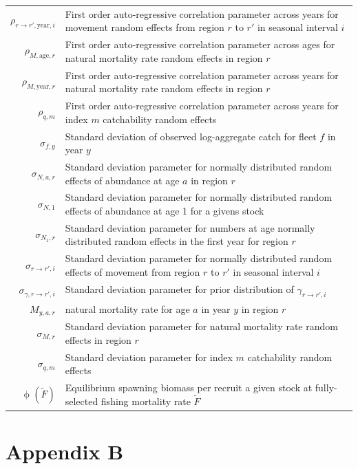 \documentclass[
]{article}
\begin{document}
\begin{longtable}[c]{r p{}}
$\rho_{r \rightarrow r',\text{year},i}$ & First order auto-regressive correlation parameter across years for movement random effects from region $r$ to $r'$ in seasonal interval $i$\\
$\rho_{M,\text{age},r}$ & First order auto-regressive correlation parameter across ages for natural mortality rate random effects in region $r$\\
$\rho_{M,\text{year},r}$ & First order auto-regressive correlation parameter across years for natural mortality rate random effects in region $r$\\
$\rho_{q,m}$ & First order auto-regressive correlation parameter across years for index $m$ catchability random effects\\
$\sigma_{f,y}$ & Standard deviation of observed log-aggregate catch for fleet $f$ in year $y$\\
$\sigma_{N,a,r}$ & Standard deviation parameter for normally distributed random effects of abundance at age $a$ in region $r$\\
$\sigma_{N,1}$ & Standard deviation parameter for normally distributed random effects of abundance at age 1 for a givens stock\\
$\sigma_{N_1,r}$ & Standard deviation parameter for numbers at age normally distributed random effects in the first year for region $r$\\
$\sigma_{r \rightarrow r',i}$ & Standard deviation parameter for normally distributed random effects of movement from region $r$ to $r'$ in seasonal interval $i$\\
$\sigma_{\gamma, r \rightarrow r',i}$ & Standard deviation parameter for prior distribution of $\gamma_{r\rightarrow r',i}$\\
$M_{y,a,r}$ & natural mortality rate for age $a$ in year $y$ in region $r$\\
$\sigma_{M,r}$ & Standard deviation parameter for natural mortality rate random effects in region $r$\\
$\sigma_{q,m}$ & Standard deviation parameter for index $m$ catchability random effects\\
$\upphi(\widetilde{F})$ & Equilibrium spawning biomass per recruit a given stock at fully-selected fishing mortality rate $\widetilde{F}$
\end{longtable}


\hypertarget{appendix-b}{%
\section*{Appendix B}\label{appendix-b}}
\end{document}
